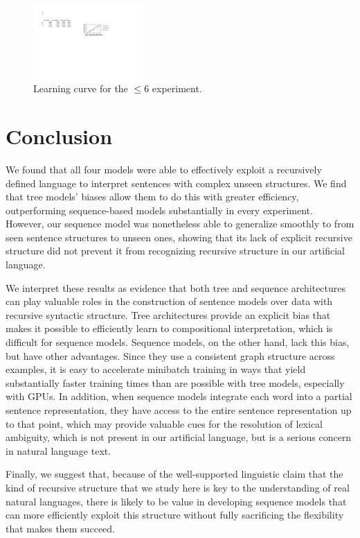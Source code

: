 \begin{figure}[t]
  \centering
      \includegraphics[height=1.1in]{lc.pdf}
  \caption{Learning curve for the $\le$6 experiment.}
  \label{fig:lc} 
\end{figure}


\section{Conclusion}

We found that all four models were able to effectively exploit a recursively defined language to interpret sentences with complex unseen structures.
We find that tree models' biases allow them to do this with greater efficiency, outperforming sequence-based models substantially in every experiment. However, our sequence model was nonetheless able to generalize smoothly to from seen sentence structures to unseen ones, showing that its lack of explicit recursive structure did not prevent it from recognizing recursive structure in our artificial language.

We interpret these results as evidence that both tree and sequence architectures can play valuable roles in the construction of sentence models over data with recursive syntactic structure. Tree architectures provide an explicit bias that makes it possible to efficiently learn to compositional interpretation, which is difficult for sequence models. Sequence models, on the other hand, lack this bias, but have other advantages. Since they use a consistent graph structure across examples, it is easy to accelerate minibatch training in ways that yield substantially faster training times than are possible with tree models, especially with GPUs. In addition, when sequence models integrate each word into a partial sentence representation, they have access to the entire sentence representation up to that point, which may provide valuable cues for the resolution of lexical ambiguity, which is not present in our artificial language, but is a serious concern in natural language text.

Finally, we suggest that, because of the well-supported linguistic claim that the kind of recursive structure that we study here is key to the understanding of real natural languages, there is likely to be value in developing sequence models that can more efficiently exploit this structure without fully sacrificing the flexibility that makes them succeed.
